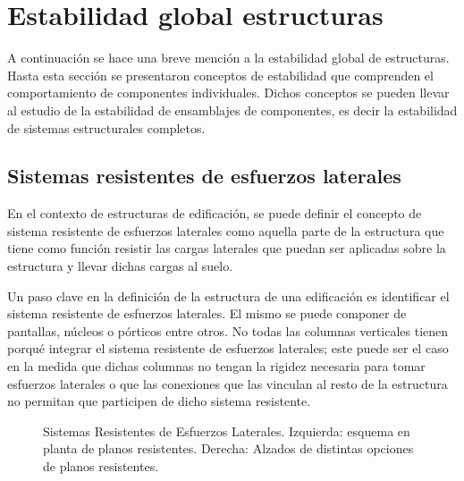 %
%
%

\section{Estabilidad global estructuras}
A continuación se hace una breve mención a la estabilidad global de estructuras. Hasta esta sección se presentaron conceptos de estabilidad que comprenden el comportamiento de componentes individuales. Dichos conceptos se pueden llevar al estudio de la estabilidad de ensamblajes de componentes, es decir la estabilidad de sistemas estructurales completos.

\subsection{Sistemas resistentes de esfuerzos laterales}
En el contexto de estructuras de edificación, se puede definir el concepto de sistema resistente de esfuerzos laterales como aquella parte de la estructura que tiene como función resistir las cargas laterales que puedan ser aplicadas sobre la estructura y llevar dichas cargas al suelo.

Un paso clave en la definición de la estructura de una edificación es identificar el sistema resistente de esfuerzos laterales. El mismo se puede componer de pantallas, núcleos o pórticos entre otros. No todas las columnas verticales tienen porqué integrar el sistema resistente de esfuerzos laterales; este puede ser el caso en la medida que dichas columnas no tengan la rigidez necesaria para tomar esfuerzos laterales o que las conexiones que las vinculan al resto de la estructura no permitan que participen de dicho sistema resistente.

\begin{figure}[htb]
  \centering
	\caption{Sistemas Resistentes de Esfuerzos Laterales. Izquierda: esquema en planta de planos resistentes. Derecha: Alzados de distintas opciones de planos resistentes.}
	\label{fig:EsqNucleos}
\end{figure}

